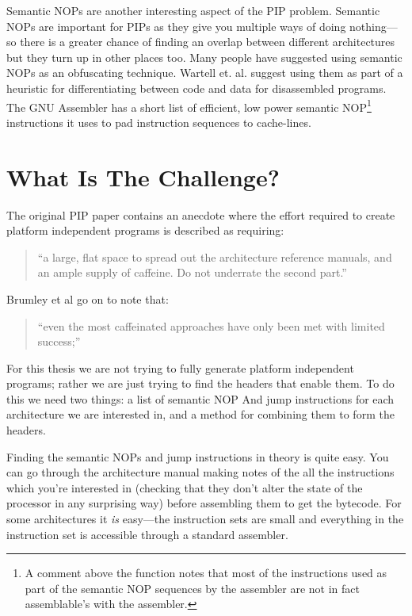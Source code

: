 \documentclass[10pt,]{book}
\begin{document}
Semantic NOPs are another interesting aspect of the PIP problem.
Semantic NOPs are important for PIPs as they give you multiple ways of
doing nothing---so there is a greater chance of finding an overlap
between different architectures but they turn up in other places too.
Many people
\autocite{Christodorescu:2005vh}\autocite{Owens:2011um}\autocite{Bruschi:2007dn}
have suggested using semantic NOPs as an obfuscating technique. Wartell
et. al.\autocite{Wartell:2011ji} suggest using them as part of a
heuristic for differentiating between code and data for disassembled
programs. The GNU Assembler has a short list of efficient, low power
semantic NOP\footnote{A comment above the
  function\autocite{Anonymous:td} notes that most of the instructions
  used as part of the semantic NOP sequences by the assembler are not in
  fact assemblable's with the assembler.} instructions it uses to pad
instruction sequences to cache-lines\autocite{Anonymous:td}.

\section{What Is The Challenge?}

The original PIP paper\autocite{Cha:2010uh} contains an anecdote where
the effort required to create platform independent programs is described
as requiring:

\begin{quote}
``a large, flat space to spread out the architecture reference manuals,
and an ample supply of caffeine. Do not underrate the second part.''

\end{quote}
Brumley et al go on to note that:

\begin{quote}
``even the most caffeinated approaches have only been met with limited
success;''

\end{quote}
For this thesis we are not trying to fully generate platform independent
programs; rather we are just trying to find the headers that enable
them. To do this we need two things: a list of semantic NOP And jump
instructions for each architecture we are interested in, and a method
for combining them to form the headers.

Finding the semantic NOPs and jump instructions in theory is quite easy.
You can go through the architecture manual making notes of the all the
instructions which you're interested in (checking that they don't alter
the state of the processor in any surprising way) before assembling them
to get the bytecode. For some architectures it \emph{is} easy---the
instruction sets are small and everything in the instruction set is
accessible through a standard assembler.
\end{document}
